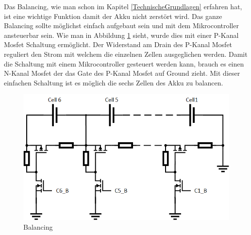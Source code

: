 Das Balancing, wie man schon im Kapitel \ref{TechnischeGrundlagen} erfahren hat, ist eine wichtige Funktion damit der Akku nicht zerstört wird. Das ganze Balancing sollte möglichst einfach aufgebaut sein und mit dem Mikrocontroller ansteuerbar sein. Wie man in Abbildung \ref{fig:Balancing} sieht, wurde dies mit einer P-Kanal Mosfet Schaltung ermöglicht. Der Widerstand am Drain des P-Kanal Mosfet reguliert den Strom mit welchem die einzelnen Zellen ausgeglichen werden. Damit die Schaltung mit einem Mikrocontroller gesteuert werden kann, brauch es einen N-Kanal Mosfet der das Gate des P-Kanal Mosfet auf Ground zieht. Mit dieser einfachen Schaltung ist es möglich die sechs Zellen des Akku zu balancen.

\begin{figure} [H]
	\centering
	\includegraphics[width=0.6\linewidth]{images/Balancing}
	\caption{Balancing}
	\label{fig:Balancing}
\end{figure}


